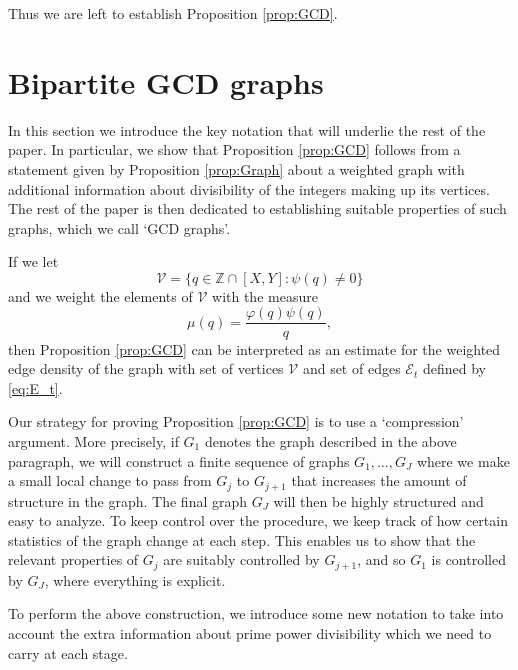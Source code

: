 \documentclass[12pt]{amsart}
\numberwithin{equation}{section}
\theoremstyle{definition}
\theoremstyle{remark}
\newcommand{\Z}{\mathbb{Z}}
\newcommand{\CE}{\mathcal{E}}
\newcommand{\CV}{\mathcal{V}}
\renewcommand{\phi}{\varphi}
\begin{document}
Thus we are left to establish Proposition \ref{prop:GCD}.

\section{Bipartite GCD graphs}\label{sec:Graph}

In this section we introduce the key notation that will underlie the rest of the paper. In particular, we show that Proposition \ref{prop:GCD} follows from a statement given by Proposition \ref{prop:Graph} about a weighted graph with additional information about divisibility of the integers making up its vertices. The rest of the paper is then dedicated to establishing suitable properties of such graphs, which we call `GCD graphs'.

If we let
\[
\CV=\{q\in\Z\cap[X,Y]:\psi(q)\neq0\}
\]
and we weight the elements of $\CV$ with the measure
\[
\mu(q)=\frac{\phi(q)\psi(q)}{q},
\]
then Proposition \ref{prop:GCD} can be interpreted as an estimate for the weighted edge density of the graph with set of vertices $\CV$ and set of edges $\CE_t$ defined by \eqref{eq:E_t}.

Our strategy for proving Proposition \ref{prop:GCD} is to use a `compression' argument. More precisely, if $G_1$ denotes the graph described in the above paragraph, we will construct a finite sequence of graphs $G_1,\dots,G_J$ where we make a small local change to pass from $G_j$ to $G_{j+1}$ that increases the amount of structure in the graph. The final graph $G_J$ will then be highly structured and easy to analyze. To keep control over the procedure, we keep track of how certain statistics of the graph change at each step. This enables us to show that the relevant properties of $G_j$ are suitably controlled by $G_{j+1}$, and so $G_1$ is controlled by $G_J$, where everything is explicit.

To perform the above construction, we introduce some new notation to take into account the extra information about prime power divisibility which we need to carry at each stage.
\end{document}
